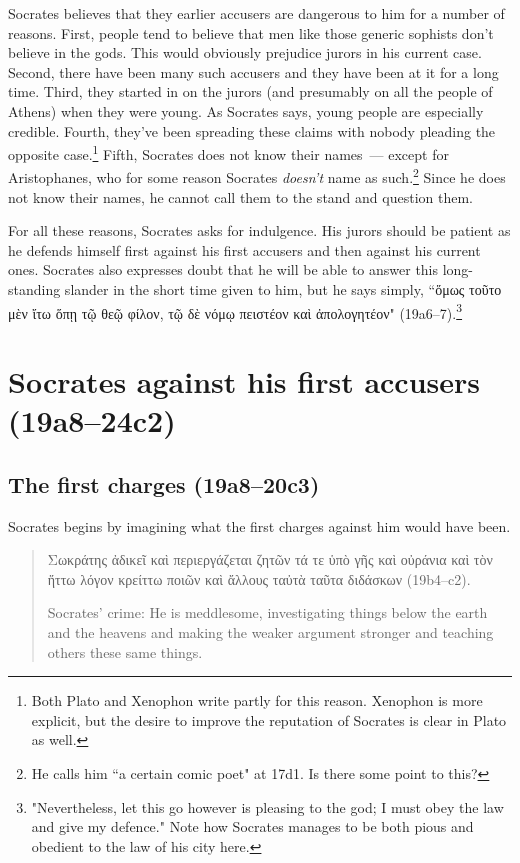\documentclass[11pt]{article}
\begin{document}
Socrates believes that they earlier accusers are dangerous to him for
a number of reasons.  First, people tend to believe that men like those
generic sophists don't believe in the gods.  This would obviously prejudice
jurors in his current case.  Second, there have been many such accusers and
they have been at it for a long time.  Third, they started in on the jurors
(and presumably on all the people of Athens) when they were young.  As
Socrates says, young people are especially credible.  Fourth, they've been
spreading these claims with nobody pleading the opposite case.\footnote{Both
Plato and Xenophon write partly for this reason.  Xenophon is more explicit,
but the desire to improve the reputation of Socrates is clear in Plato as
well.}  Fifth, Socrates does not know their names~--- except for
Aristophanes, who for some reason Socrates \emph{doesn't} name as
such.\footnote{He calls him ``a certain comic poet" at 17d1.  Is there some
point to this?}  Since he does not know their names, he cannot call them to
the stand and question them.

For all these reasons, Socrates asks for indulgence.  His jurors should be
patient as he defends himself first against his first accusers and then
against his current ones.  Socrates also expresses doubt that he will be
able to answer this long-standing slander in the short time given to him,
but he says simply, ``ὅμως τοῦτο μὲν ἴτω ὅπῃ τῷ θεῷ φίλον, τῷ δὲ νόμῳ
πειστέον καὶ ἀπολογητέον" (19a6--7).\footnote{"Nevertheless, let this go
however is pleasing to the god; I must obey the law and give my defence."
Note how Socrates manages to be both pious and obedient to the law of his
city here.}

\section{Socrates against his first accusers (19a8--24c2)}

\subsection{The first charges (19a8--20c3)}

Socrates begins by imagining what the first charges against him would have
been.

\begin{quote}
    Σωκράτης ἀδικεῖ καὶ περιεργάζεται ζητῶν τά τε ὑπὸ γῆς καὶ οὐράνια καὶ
    τὸν ἥττω λόγον κρείττω ποιῶν καὶ ἄλλους ταὐτὰ ταῦτα διδάσκων
    (19b4--c2).

    Socrates' crime: He is meddlesome, investigating things below the earth
    and the heavens and making the weaker argument stronger and teaching
    others these same things.
\end{quote}
\end{document}
